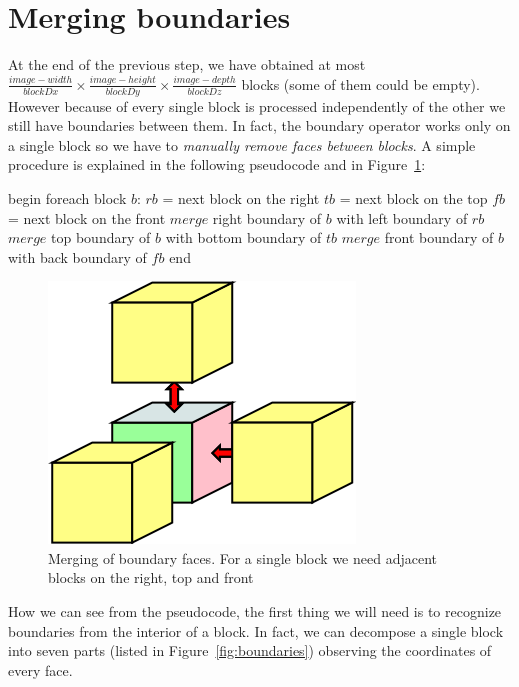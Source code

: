 \section{Merging boundaries}\label{sec33:Boundaries}

At the end of the previous step, we have obtained at most $\displaystyle\frac{image-width}{blockDx} \times \displaystyle\frac{image-height}{blockDy} \times \displaystyle\frac{image-depth}{blockDz}$ blocks (some of them could be empty). However because of every single block is processed independently of the other we still have boundaries between them. In fact, the boundary operator works only on a single block so we have to \textit{manually remove faces between blocks}. A simple procedure is explained in the following pseudocode and in Figure~\ref{fig:boundaryMergeIteration}:

\begin{pseudo}[caption={Removal of internal boundaries}, label={lst:boundaryRemoval}]
begin
  foreach block $b$:
    $rb$ = next block on the right
    $tb$ = next block on the top
    $fb$ = next block on the front
    $merge$ right boundary of $b$ with left boundary of $rb$
    $merge$ top boundary of $b$ with bottom boundary of $tb$
    $merge$ front boundary of $b$ with back boundary of $fb$
end
\end{pseudo}

\begin{figure}[htb] %
   \centering
   \includegraphics[width=0.30\linewidth]{images/BoundaryMergeIteration.png}
   \caption[Merging of boundary faces]{Merging of boundary faces. For a single block we need adjacent blocks on the right, top and front}
   \label{fig:boundaryMergeIteration}
\end{figure}

How we can see from the pseudocode, the first thing we will need is to recognize boundaries from the interior of a block. In fact, we can decompose a single block into seven parts (listed in Figure~\ref{fig:boundaries}) observing the coordinates of every face.

